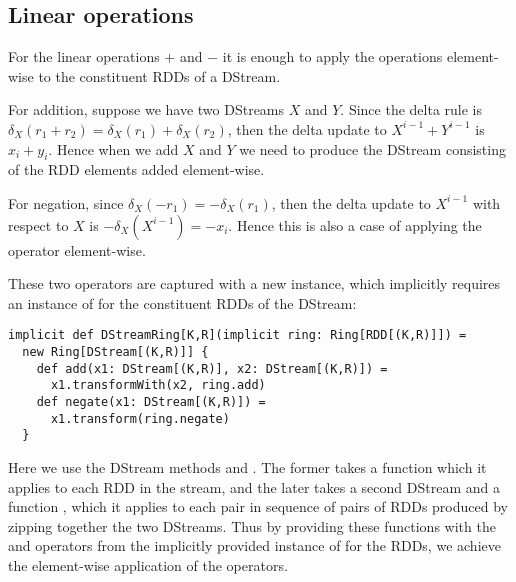 \subsection{Linear operations}
For the linear operations $+$ and $-$ it is enough to apply the operations element-wise to the constituent RDDs of a DStream.

For addition, suppose we have two DStreams $X$ and $Y$. Since the delta rule is $\delta_X(r_1 + r_2) = \delta_X(r_1) + \delta_X(r_2)$, then the delta update to $X^{i-1} + Y^{i-1}$ is $x_i + y_i$. Hence when we add $X$ and $Y$ we need to produce the DStream consisting of the RDD elements added element-wise.

For negation, since $\delta_X(-r_1) = -\delta_X(r_1)$, then the delta update to $X^{i-1}$ with respect to $X$ is $-\delta_X(X^{i-1}) = -x_i$. Hence this is also a case of applying the operator element-wise.

These two operators are captured with a new  instance, which implicitly requires an instance of  for the constituent RDDs of the DStream:
\vs\begin{lstlisting}
implicit def DStreamRing[K,R](implicit ring: Ring[RDD[(K,R)]]) =
  new Ring[DStream[(K,R)]] {  
    def add(x1: DStream[(K,R)], x2: DStream[(K,R)]) =
      x1.transformWith(x2, ring.add)
    def negate(x1: DStream[(K,R)]) =
      x1.transform(ring.negate)
  }
\end{lstlisting}\vs
Here we use the DStream methods  and . The former takes a function  which it applies to each RDD in the stream, and the later takes a second DStream and a function , which it applies to each pair in sequence of pairs of RDDs produced by zipping together the two DStreams. Thus by providing these functions with the  and  operators from the implicitly provided instance of   for the RDDs, we achieve the element-wise application of the operators.

